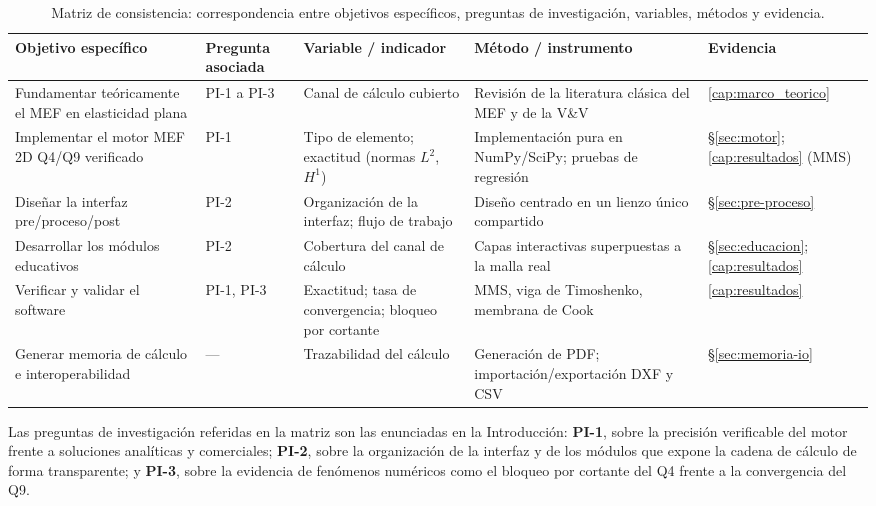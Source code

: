 \begin{table}[htbp]
\centering
\caption[Matriz de consistencia de la investigación.]{Matriz de consistencia: correspondencia entre objetivos específicos, preguntas de investigación, variables, métodos y evidencia.}
\label{tab:consistencia}
{\footnotesize
\setlength{\tabcolsep}{4pt}
\renewcommand{\arraystretch}{1.2}
\begin{tabular}{@{}p{3.0cm}p{2.3cm}p{2.7cm}p{2.7cm}p{2.4cm}@{}}
\toprule
\textbf{Objetivo específico} & \textbf{Pregunta asociada} & \textbf{Variable / indicador} & \textbf{Método / instrumento} & \textbf{Evidencia} \\
\midrule
Fundamentar teóricamente el MEF en elasticidad plana & PI-1 a PI-3 & Canal de cálculo cubierto & Revisión de la literatura clásica del MEF y de la V\&V & \autoref{cap:marco_teorico} \\
Implementar el motor MEF 2D Q4/Q9 verificado & PI-1 & Tipo de elemento; exactitud (normas $L^2$, $H^1$) & Implementación pura en NumPy/SciPy; pruebas de regresión & \S\ref{sec:motor}; \autoref{cap:resultados} (MMS) \\
Diseñar la interfaz pre/proceso/post & PI-2 & Organización de la interfaz; flujo de trabajo & Diseño centrado en un lienzo único compartido & \S\ref{sec:pre-proceso} \\
Desarrollar los módulos educativos & PI-2 & Cobertura del canal de cálculo & Capas interactivas superpuestas a la malla real & \S\ref{sec:educacion}; \autoref{cap:resultados} \\
Verificar y validar el software & PI-1, PI-3 & Exactitud; tasa de convergencia; bloqueo por cortante & MMS, viga de Timoshenko, membrana de Cook & \autoref{cap:resultados} \\
Generar memoria de cálculo e interoperabilidad & --- & Trazabilidad del cálculo & Generación de PDF; importación/exportación DXF y CSV & \S\ref{sec:memoria-io} \\
\bottomrule
\end{tabular}}
\renewcommand{\arraystretch}{1.0}
\end{table}

Las preguntas de investigación referidas en la matriz son las enunciadas en la Introducción: \textbf{PI-1}, sobre la precisión verificable del motor frente a soluciones analíticas y comerciales; \textbf{PI-2}, sobre la organización de la interfaz y de los módulos que expone la cadena de cálculo de forma transparente; y \textbf{PI-3}, sobre la evidencia de fenómenos numéricos como el bloqueo por cortante del Q4 frente a la convergencia del Q9.

